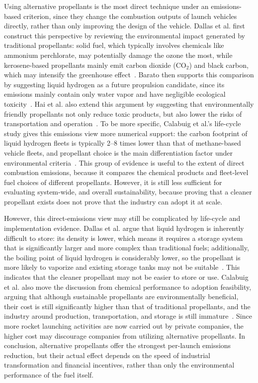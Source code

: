 \documentclass[12pt]{article}
\begin{document}
Using alternative propellants is the most direct technique under an emissions-based criterion, since they change the combustion outputs of launch vehicles directly, rather than only improving the design of the vehicle. Dallas et al. first construct this perspective by reviewing the environmental impact generated by traditional propellants: solid fuel, which typically involves chemicals like ammonium perchlorate, may potentially damage the ozone the most, while kerosene-based propellants mainly emit carbon dioxide (CO$_2$) and black carbon, which may intensify the greenhouse effect~\citep{dallas2020review}. Barato then supports this comparison by suggesting liquid hydrogen as a future propulsion candidate, since its emissions mainly contain only water vapor and have negligible ecological toxicity~\citep{barato2023fuels}. Hai et al. also extend this argument by suggesting that environmentally friendly propellants not only reduce toxic products, but also lower the risks of transportation and operation~\citep{hai2026propellants}. To be more specific, Calabuig et al.'s life-cycle study gives this emissions view more numerical support: the carbon footprint of liquid hydrogen fleets is typically 2--8 times lower than that of methane-based vehicle fleets, and propellant choice is the main differentiation factor under environmental criteria~\citep{calabuig2024reusable}. This group of evidence is useful to the extent of direct combustion emissions, because it compares the chemical products and fleet-level fuel choices of different propellants. However, it is still less sufficient for evaluating system-wide, and overall sustainability, because proving that a cleaner propellant exists does not prove that the industry can adopt it at scale.

However, this direct-emissions view may still be complicated by life-cycle and implementation evidence. Dallas et al. argue that liquid hydrogen is inherently difficult to store: its density is lower, which means it requires a storage system that is significantly larger and more complex than traditional fuels; additionally, the boiling point of liquid hydrogen is considerably lower, so the propellant is more likely to vaporize and existing storage tanks may not be suitable~\citep{dallas2020review}. This indicates that the cleaner propellant may not be easier to store or use. Calabuig et al. also move the discussion from chemical performance to adoption feasibility, arguing that although sustainable propellants are environmentally beneficial, their cost is still significantly higher than that of traditional propellants, and the industry around production, transportation, and storage is still immature~\citep{calabuig2024reusable}. Since more rocket launching activities are now carried out by private companies, the higher cost may discourage companies from utilizing alternative propellants. In conclusion, alternative propellants offer the strongest per-launch emissions reduction, but their actual effect depends on the speed of industrial transformation and financial incentives, rather than only the environmental performance of the fuel itself.
\end{document}
